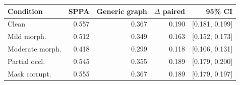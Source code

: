 \begin{tabular}{@{}lrrrr@{}}
\toprule
Condition & SPPA & Generic graph & $\Delta$ paired & 95\% CI \\
\midrule
Clean & 0.557 & 0.367 & 0.190 & [0.181, 0.199] \\
Mild morph. & 0.512 & 0.349 & 0.163 & [0.152, 0.173] \\
Moderate morph. & 0.418 & 0.299 & 0.118 & [0.106, 0.131] \\
Partial occl. & 0.545 & 0.355 & 0.189 & [0.179, 0.200] \\
Mask corrupt. & 0.555 & 0.367 & 0.189 & [0.179, 0.197] \\
\bottomrule
\end{tabular}

